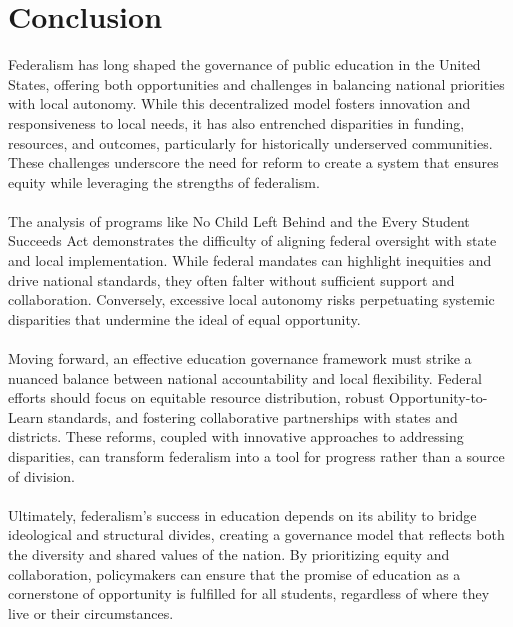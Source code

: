 \documentclass[11pt]{extarticle}
\begin{document}
\section{Conclusion}
Federalism has long shaped the governance of public education in the United States, offering both opportunities and challenges in balancing national priorities with local autonomy. While this decentralized model fosters innovation and responsiveness to local needs, it has also entrenched disparities in funding, resources, and outcomes, particularly for historically underserved communities. These challenges underscore the need for reform to create a system that ensures equity while leveraging the strengths of federalism.  \\
\\
The analysis of programs like No Child Left Behind and the Every Student Succeeds Act demonstrates the difficulty of aligning federal oversight with state and local implementation. While federal mandates can highlight inequities and drive national standards, they often falter without sufficient support and collaboration. Conversely, excessive local autonomy risks perpetuating systemic disparities that undermine the ideal of equal opportunity.\\
\\
Moving forward, an effective education governance framework must strike a nuanced balance between national accountability and local flexibility. Federal efforts should focus on equitable resource distribution, robust Opportunity-to-Learn standards, and fostering collaborative partnerships with states and districts. These reforms, coupled with innovative approaches to addressing disparities, can transform federalism into a tool for progress rather than a source of division.\\
\\
Ultimately, federalism’s success in education depends on its ability to bridge ideological and structural divides, creating a governance model that reflects both the diversity and shared values of the nation. By prioritizing equity and collaboration, policymakers can ensure that the promise of education as a cornerstone of opportunity is fulfilled for all students, regardless of where they live or their circumstances.


\pagebreak
\end{document}
